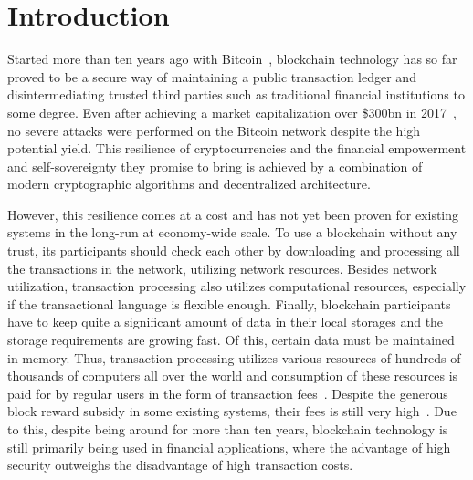 \section{Introduction}
\label{sec:intro}


Started more than ten years ago with Bitcoin~\cite{nakamoto2008bitcoin}, blockchain technology has so far proved
to be a secure way of maintaining a public transaction ledger and disintermediating trusted third parties such as 
traditional financial institutions to some degree.
Even after achieving a market capitalization over \$300bn in 2017~\cite{btcPrice},
no severe attacks were performed on the Bitcoin network despite the high potential yield.
This resilience of cryptocurrencies and the financial empowerment and self-sovereignty they promise to bring is
achieved by a combination of modern cryptographic algorithms and decentralized architecture.

However, this resilience comes at a cost 
and has not yet been proven for existing systems in the long-run at economy-wide scale.
To use a blockchain without any trust, its participants should check each other by downloading and
processing all the transactions in the network, utilizing network resources.
Besides network utilization, transaction processing also utilizes computational resources,
especially if the transactional language is flexible enough.
Finally, blockchain participants have to keep quite a significant amount of data in their local storages and
the storage requirements are growing fast. Of this, certain data must be maintained in memory.
Thus, transaction processing utilizes various resources of hundreds of thousands of computers all over the world
and consumption of these resources is paid for by regular users in the form of transaction fees~\cite{chepurnoy2018systematic}.
Despite the generous block reward subsidy in some existing systems, their fees is still very high~\cite{bitcoinFees}. Due to this, despite being around for more than ten years, blockchain technology is still primarily being used in financial applications, where the advantage of high security outweighs the disadvantage of high transaction costs.

